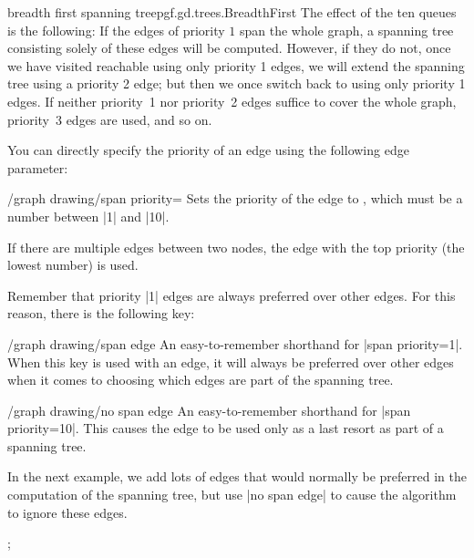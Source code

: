 \begin{gdalgorithm}{breadth first spanning tree}{pgf.gd.trees.BreadthFirst}
  The effect of the ten queues is the following: If the edges of
  priority $1$ span the whole graph, a spanning tree consisting solely
  of these edges will be computed. However, if they do not, once we
  have visited reachable using only priority 1 edges, we will extend
  the spanning tree using a priority 2 edge; but then we once switch
  back to using only priority 1 edges. If neither priority~1 nor
  priority~2 edges suffice to cover the whole graph, priority~3 edges
  are used, and so on.
  
  You can directly specify the priority of an edge using the following
  edge parameter:
  \begin{key}{/graph drawing/span priority=}
    Sets the priority of the edge to , which must be
    a number between |1| and |10|.
  \end{key}
  If there are multiple edges between two nodes, the edge with the top
  priority (the lowest number) is used.

  Remember that priority |1| edges are always preferred over other
  edges. For this reason, there is the following key:
  \begin{key}{/graph drawing/span edge}
    An easy-to-remember shorthand for |span priority=1|. When this key
    is used with an edge, it will always be preferred over other edges
    when it comes to choosing which edges are part of the spanning tree.    
  \end{key}
  \begin{key}{/graph drawing/no span edge}
    An easy-to-remember shorthand for |span priority=10|. This causes
    the edge to be used only as a last resort as part of a spanning
    tree. 
    
    In the next example, we add lots of edges that would normally be
    preferred in the computation of the spanning tree, but use
    |no span edge| to cause the algorithm to ignore these edges.
\begin{codeexample}[]
\tikz {};
\end{codeexample}     
  \end{key}


\end{gdalgorithm}
